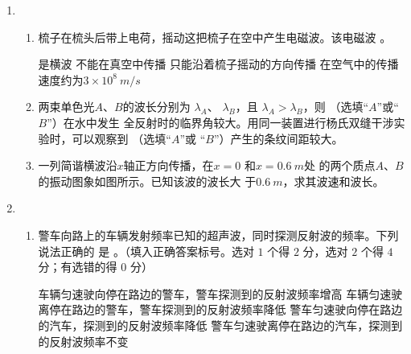 \begin{enumerate}
\item 
{}
\begin{enumerate}
	\item
梳子在梳头后带上电荷，摇动这把梳子在空中产生电磁波。该电磁波 \underlinegap 。

\fourchoices
{是横波}
{不能在真空中传播}
{只能沿着梳子摇动的方向传播}
{在空气中的传播速度约为$ 3 \times 10^{8} \ m /s $}



\item 
两束单色光$ A $、$ B $的波长分别为 $ \lambda_{A} $、 $ \lambda_{B} $，且 $\lambda_{A}>\lambda_{B}$，则 
 \underlinegap 
（选填“$ A $”或“$ B $”）在水中发生
全反射时的临界角较大。用同一装置进行杨氏双缝干涉实验时，可以观察到  \underlinegap  （选填“$ A $”或
“$ B $”）产生的条纹间距较大。



\item 
一列简谐横波沿$ x $轴正方向传播，在$ x=0 $ 和$ x=0.6 \ m $处
的两个质点$ A $、$ B $的振动图象如图所示。已知该波的波长大
于$ 0.6 \ m $，求其波速和波长。
\begin{figure}[h!]
	\flushright
	
\end{figure}




\end{enumerate}




\item 
{}
\begin{enumerate}
	\item
警车向路上的车辆发射频率已知的超声波，同时探测反射波的频率。下列说法正确的
是 \underlinegap 。（填入正确答案标号。选对 $ 1 $ 个得 $ 2 $ 分，选对 $ 2 $ 个得 $ 4 $ 分；有选错的得 $ 0 $ 分）

\fourchoices
{车辆匀速驶向停在路边的警车，警车探测到的反射波频率增高}
{车辆匀速驶离停在路边的警车，警车探测到的反射波频率降低}
{警车匀速驶向停在路边的汽车，探测到的反射波频率降低}
{警车匀速驶离停在路边的汽车，探测到的反射波频率不变}



\end{enumerate}
\end{enumerate}
